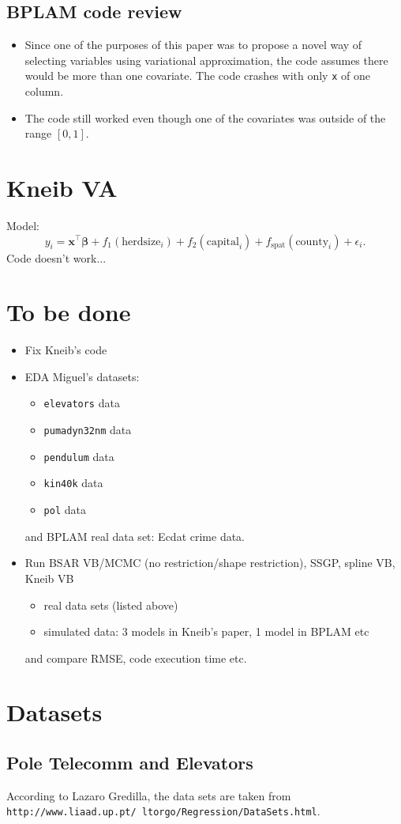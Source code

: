 \documentclass[11pt]{article}
\newcommand{\bs}{\boldsymbol}
\begin{document}
\subsection{BPLAM code review}
  \begin{itemize}
  \item Since one of the purposes of this paper was to propose a novel way of selecting variables using variational approximation, the code assumes there would be more than one covariate. The code crashes with only \texttt{x} of one column.
  \item The code still worked even though one of the covariates was outside of the range $\left[0,1\right]$. 
  \end{itemize}
\section{Kneib VA}
Model:
\begin{equation}
  y_{i} = \mathbf{x}^{\top}\bs{\beta}+f_{1}\left(\text{herdsize}_{i}\right)+f_{2}\left(\text{capital}_{i}\right)+f_{\text{spat}}\left(\text{county}_{i}\right) + \epsilon_{i}.
\end{equation}
Code doesn't work...
\section{To be done}
\begin{itemize}
  \item Fix Kneib's code
  \item EDA Miguel's datasets:
    \begin{itemize}
      \item \texttt{elevators} data
      \item \texttt{pumadyn32nm} data
      \item \texttt{pendulum} data
      \item \texttt{kin40k} data
      \item \texttt{pol} data
    \end{itemize}
    and BPLAM real data set: \textsf{Ecdat} crime data.
  \item Run BSAR VB/MCMC (no restriction/shape restriction), SSGP, spline VB, Kneib VB
    \begin{itemize}
      \item real data sets (listed above)
      \item simulated data: 3 models in Kneib's paper, 1 model in BPLAM etc
    \end{itemize}
    and compare RMSE, code execution time etc.
\end{itemize}
\section{Datasets}
\subsection{Pole Telecomm and Elevators}
  According to Lazaro Gredilla, the data sets are taken from \texttt{http://www.liaad.up.pt/~ltorgo/Regression/DataSets.html}. 
\end{document}

